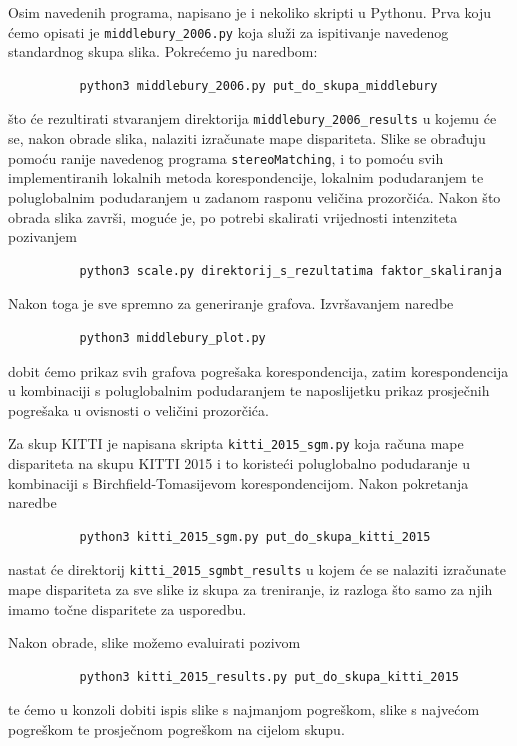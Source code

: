 \documentclass[utf8, zavrsni, numeric]{fer}
\begin{document}
Osim navedenih programa, napisano je i nekoliko skripti u Pythonu. Prva koju ćemo opisati je
{\verb|middlebury_2006.py|} koja služi za ispitivanje navedenog standardnog skupa slika.
Pokrećemo ju naredbom:
\begin{verbatim}
          python3 middlebury_2006.py put_do_skupa_middlebury
\end{verbatim}
što će rezultirati stvaranjem direktorija {\verb|middlebury_2006_results|} u kojemu će se, nakon
obrade slika, nalaziti izračunate mape dispariteta. Slike se obrađuju pomoću ranije navedenog
programa {\verb|stereoMatching|}, i to pomoću svih implementiranih lokalnih metoda korespondencije, lokalnim
podudaranjem te poluglobalnim podudaranjem u zadanom rasponu veličina prozorčića.
Nakon što obrada slika završi, moguće je, po potrebi skalirati vrijednosti intenziteta
pozivanjem
\begin{verbatim}
          python3 scale.py direktorij_s_rezultatima faktor_skaliranja
\end{verbatim}

Nakon toga je sve spremno za generiranje grafova. Izvršavanjem naredbe
\begin{verbatim}
          python3 middlebury_plot.py
\end{verbatim}
dobit ćemo prikaz svih grafova pogrešaka korespondencija, zatim korespondencija u kombinaciji
s poluglobalnim podudaranjem te naposlijetku prikaz prosječnih pogrešaka u ovisnosti o
veličini prozorčića.

Za skup KITTI je napisana skripta {\verb|kitti_2015_sgm.py|} koja računa mape dispariteta
na skupu KITTI 2015 i to koristeći poluglobalno podudaranje u kombinaciji s Birchfield-Tomasijevom korespondencijom. Nakon pokretanja naredbe
\begin{verbatim}
          python3 kitti_2015_sgm.py put_do_skupa_kitti_2015
\end{verbatim}
nastat će direktorij {\verb|kitti_2015_sgmbt_results|} u kojem će se nalaziti izračunate
mape dispariteta za sve slike iz skupa za treniranje, iz razloga što samo za njih imamo točne
disparitete za usporedbu.

Nakon obrade, slike možemo evaluirati pozivom
\begin{verbatim}
          python3 kitti_2015_results.py put_do_skupa_kitti_2015
\end{verbatim}
te ćemo u konzoli dobiti ispis slike s najmanjom pogreškom, slike s najvećom pogreškom te
prosječnom pogreškom na cijelom skupu.
\end{document}
